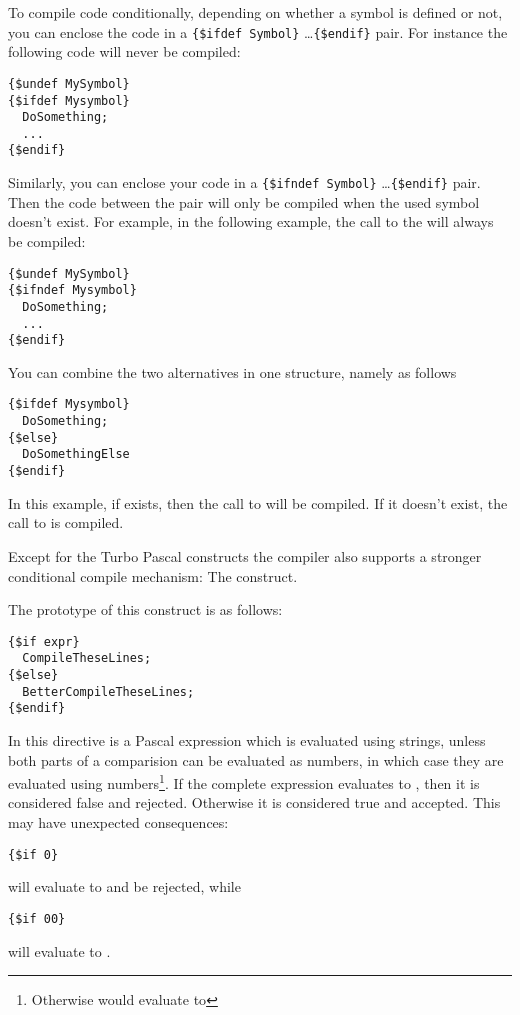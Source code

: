 To compile code conditionally, depending on whether a symbol is defined or
not, you can enclose the code in a \verb|{$ifdef Symbol}| \dots \verb|{$endif}|
pair. For instance the following code will never be compiled:
\begin{verbatim}
{$undef MySymbol}
{$ifdef Mysymbol}
  DoSomething;
  ...
{$endif}
\end{verbatim}

Similarly, you can enclose your code in a \verb|{$ifndef Symbol}| \dots \verb|{$endif}|
pair. Then the code between the pair will only be compiled when the used
symbol doesn't exist. For example, in the following example, the call to the
 will always be compiled:
\begin{verbatim}
{$undef MySymbol}
{$ifndef Mysymbol}
  DoSomething;
  ...
{$endif}
\end{verbatim}

You can combine the two alternatives in one structure, namely as follows
\begin{verbatim}
{$ifdef Mysymbol}
  DoSomething;
{$else}
  DoSomethingElse
{$endif}
\end{verbatim}
In this example, if  exists, then the call to 
will be compiled. If it doesn't exist, the call to  is
compiled.

Except for the Turbo Pascal constructs the \fpc compiler also
supports a stronger conditional compile mechanism: The 
construct.

The prototype of this construct is as follows:
\begin{verbatim}
{$if expr}
  CompileTheseLines;
{$else}
  BetterCompileTheseLines;
{$endif}
\end{verbatim}
In this directive  is a Pascal expression which is evaluated using
strings, unless both parts of a comparision can be evaluated as numbers,
in which case they are evaluated using numbers\footnote{Otherwise
 would evaluate to }.
If the complete expression evaluates to , then it is considered
false and rejected. Otherwise it is considered true and accepted. This may
have unexpected consequences:
\begin{verbatim}
{$if 0}
\end{verbatim}
will evaluate to  and be rejected, while
\begin{verbatim}
{$if 00}
\end{verbatim}
will evaluate to .

